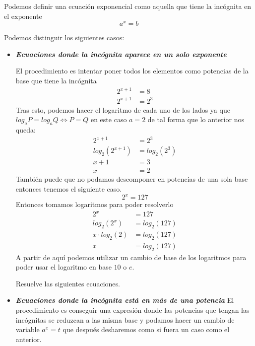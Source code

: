 \begin{defi}
Podemos definir una ecuación exponencial como aquella que tiene la incógnita en el exponente
\begin{equation*}
a^x=b
\end{equation*}
\end{defi}
\noindent
Podemos distinguir los siguientes casos:
\begin{itemize}
\item \textbf{\textit{Ecuaciones donde la incógnita aparece en un solo exponente}}

El procedimiento es intentar poner todos los elementos como potencias de la base que tiene la incógnita
\begin{align*}
2^{x+1}&=8\\
2^{x+1}&=2^3
\end{align*}
Tras esto, podemos hacer el logaritmo de cada uno de los lados ya que $log_a P=log_a Q \Leftrightarrow P=Q$ en este caso $a=2$ de tal forma que lo anterior nos queda:
\begin{align*}
2^{x+1}&=2^3\\
log_2( 2^{x+1})&=log_2 (2^3)\\
x+1&=3\\
x&=2
\end{align*}
También puede que no podamos descomponer en potencias de una sola base entonces tenemos el siguiente caso.
\begin{equation*}
2^x=127
\end{equation*}
Entonces tomamos logaritmos para poder resolverlo
\begin{align*}
2^x&=127\\
log_2(2^x)&=log_2(127)\\
x \cdot log_2(2)&=log_2(127)\\
x&=log_2(127)
\end{align*}
A partir de aquí podemos utilizar un cambio de base de los logaritmos para poder usar el logaritmo en base $10$ o $e$.

\begin{ejercicio}
Resuelve las siguientes ecuaciones. 
\\
\end{ejercicio}
\newpage 
\item \textbf{\textit{Ecuaciones donde la incógnita está en más de una potencia}}
El procedimiento es conseguir una expresión donde las potencias que tengan las incógnitas se reduzcan a las misma base y podamos hacer un cambio de variable $a^x=t$ que después desharemos como si fuera un caso como el anterior. 

\end{itemize}


